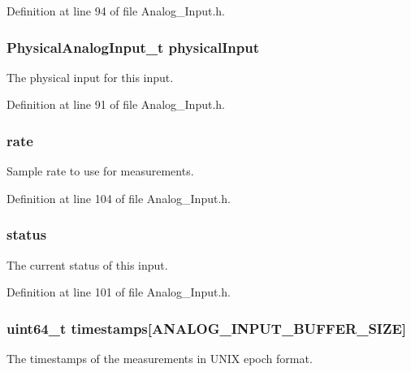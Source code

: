 Definition at line 94 of file Analog\-\_\-\-Input.\-h.

\hypertarget{struct_analog___input__t_a56b9dddfb002a9709f8591dd04c06db8}{
\subsubsection[{physical\-Input}]{\setlength{\rightskip}{0pt plus 5cm}Physical\-Analog\-Input\-\_\-t physical\-Input}}\label{struct_analog___input__t_a56b9dddfb002a9709f8591dd04c06db8}
The physical input for this input. 

Definition at line 91 of file Analog\-\_\-\-Input.\-h.

\hypertarget{struct_analog___input__t_a8b7d6ee501678613c98e13a2dfbf33b5}{
\subsubsection[{rate}]{ rate}}\label{struct_analog___input__t_a8b7d6ee501678613c98e13a2dfbf33b5}
Sample rate to use for measurements. 

Definition at line 104 of file Analog\-\_\-\-Input.\-h.

\hypertarget{struct_analog___input__t_ad008fd04a92bd503317246b84bedf3bc}{
\subsubsection[{status}]{ status}}\label{struct_analog___input__t_ad008fd04a92bd503317246b84bedf3bc}
The current status of this input. 

Definition at line 101 of file Analog\-\_\-\-Input.\-h.

\hypertarget{struct_analog___input__t_a611ead9e1d73ef2c8cac3f7cc95b0c17}{
\subsubsection[{timestamps}]{\setlength{\rightskip}{0pt plus 5cm}uint64\-\_\-t timestamps\mbox{[}{\bf A\-N\-A\-L\-O\-G\-\_\-\-I\-N\-P\-U\-T\-\_\-\-B\-U\-F\-F\-E\-R\-\_\-\-S\-I\-Z\-E}\mbox{]}}}\label{struct_analog___input__t_a611ead9e1d73ef2c8cac3f7cc95b0c17}
The timestamps of the measurements in U\-N\-I\-X epoch format. 

